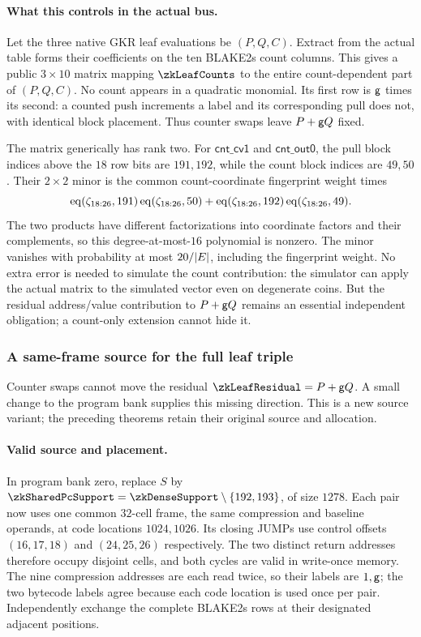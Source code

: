 \paragraph{What this controls in the actual bus.} Let the three native GKR leaf evaluations be $(P,Q,C)$. Extract from the actual table forms their coefficients on the ten BLAKE2s count columns. This gives a public $3\times10$ matrix mapping $\zkLeafCounts$ to the entire count-dependent part of $(P,Q,C)$. No count appears in a quadratic monomial. Its first row is $\mathsf{g}$ times its second: a counted push increments a label and its corresponding pull does not, with identical block placement. Thus counter swaps leave $P+\mathsf{g} Q$ fixed.

The matrix generically has rank two. For $\mathsf{cnt\_cv1}$ and $\mathsf{cnt\_out0}$, the pull block indices above the $18$ row bits are $191,192$, while the count block indices are $49,50$. Their $2\times2$ minor is the common count-coordinate fingerprint weight times
\[
 \operatorname{eq}(\zeta_{18:26},191)\operatorname{eq}(\zeta_{18:26},50)
 +\operatorname{eq}(\zeta_{18:26},192)\operatorname{eq}(\zeta_{18:26},49).
\]
The two products have different factorizations into coordinate factors and their complements, so this degree-at-most-$16$ polynomial is nonzero. The minor vanishes with probability at most $20/|E|$, including the fingerprint weight. No extra error is needed to simulate the count contribution: the simulator can apply the actual matrix to the simulated vector even on degenerate coins. But the residual address/value contribution to $P+\mathsf{g} Q$ remains an essential independent obligation; a count-only extension cannot hide it.

\subsubsection{A same-frame source for the full leaf triple}

Counter swaps cannot move the residual $\zkLeafResidual=P+\gen Q$. A small change to the program bank supplies this missing direction. This is a new source variant; the preceding theorems retain their original source and allocation.

\paragraph{Valid source and placement.} In program bank zero, replace $S$ by $\zkSharedPcSupport=\zkDenseSupport\setminus\{192,193\}$, of size $1278$. Each pair now uses one common $32$-cell frame, the same compression and baseline operands, at code locations $1024,1026$. Its closing JUMPs use control offsets $(16,17,18)$ and $(24,25,26)$ respectively. The two distinct return addresses therefore occupy disjoint cells, and both cycles are valid in write-once memory. The nine compression addresses are each read twice, so their labels are $1,\mathsf{g}$; the two bytecode labels agree because each code location is used once per pair. Independently exchange the complete BLAKE2s rows at their designated adjacent positions.

